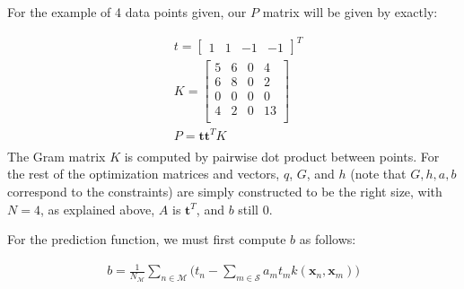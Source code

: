 \documentclass[10pt]{article}
\begin{document}
For the example of 4 data points given, our $P$ matrix will be given by exactly:

\begin{equation}
\begin{aligned}
& t = \begin{bmatrix} 1 & 1 & -1 & -1 \end{bmatrix}^T \\
& K = \begin{bmatrix} 
5 & 6 & 0 & 4  \\
6 & 8 & 0 & 2  \\
0 & 0 & 0 & 0  \\
4 & 2 & 0 & 13  \\
\end{bmatrix} \\
& P =  \mathbf{t}\mathbf{t}^T K\\
\end{aligned}
\end{equation}
The Gram matrix $K$ is computed by pairwise dot product between points.  For the rest of the optimization matrices and vectors, $q$, $G$, and $h$ (note that $G,h,a,b$ correspond to the constraints) are simply constructed to be the right size, with $N=4$, as explained above, $A$ is $\mathbf{t}^T$, and $b$ still $0$.


For the prediction function, we must first compute $b$ as follows:

\begin{equation}
\begin{aligned}
b = \frac{1}{N_\mathcal{M}} \sum_{n \in \mathcal{M}} \bigg(t_n  - \sum_{m \in \mathcal{S}} a_mt_mk(\mathbf{x}_n, \mathbf{x}_m) \bigg)
\end{aligned}
\end{equation}
\end{document}
